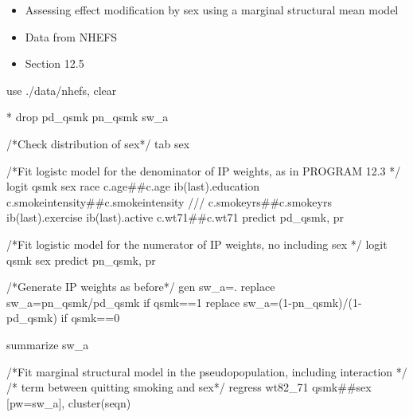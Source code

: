 \documentclass[
  10pt,
  a4paper,
]{book}
\newenvironment{Shaded}{\begin{snugshade}}{\end{snugshade}}
\newcommand{\CommentTok}[1]{\textcolor[rgb]{0.37,0.37,0.37}{#1}}
\newcommand{\FunctionTok}[1]{\textcolor[rgb]{0.28,0.35,0.67}{#1}}
\newcommand{\KeywordTok}[1]{\textcolor[rgb]{0.00,0.46,0.62}{#1}}
\newcommand{\NormalTok}[1]{\textcolor[rgb]{0.00,0.46,0.62}{#1}}
\providecommand{\tightlist}{%
  \setlength{\itemsep}{0pt}\setlength{\parskip}{0pt}}
\begin{document}
\begin{itemize}
\tightlist
\item
  Assessing effect modification by sex using a marginal structural mean model
\item
  Data from NHEFS
\item
  Section 12.5
\end{itemize}

\begin{Shaded}
\begin{Highlighting}[]
\KeywordTok{use}\NormalTok{ ./}\KeywordTok{data}\NormalTok{/nhefs, }\KeywordTok{clear}

\NormalTok{* }\KeywordTok{drop}\NormalTok{ pd\_qsmk pn\_qsmk sw\_a}

\CommentTok{/*Check distribution of sex*/}
\KeywordTok{tab}\NormalTok{ sex}

\CommentTok{/*Fit logistc model for the denominator of IP weights, as in PROGRAM 12.3 */}
\KeywordTok{logit}\NormalTok{ qsmk sex race c.age\#\#c.age ib(}\FunctionTok{last}\NormalTok{).education c.smokeintensity\#\#c.smokeintensity }\CommentTok{///}
\NormalTok{c.smokeyrs\#\#c.smokeyrs ib(}\FunctionTok{last}\NormalTok{).exercise ib(}\FunctionTok{last}\NormalTok{).active c.wt71\#\#c.wt71 }
\KeywordTok{predict}\NormalTok{ pd\_qsmk, pr}

\CommentTok{/*Fit logistic model for the numerator of IP weights, no including sex */}
\KeywordTok{logit}\NormalTok{ qsmk sex}
\KeywordTok{predict}\NormalTok{ pn\_qsmk, pr}

\CommentTok{/*Generate IP weights as before*/}
\KeywordTok{gen}\NormalTok{ sw\_a=.}
\KeywordTok{replace}\NormalTok{ sw\_a=pn\_qsmk/pd\_qsmk }\KeywordTok{if}\NormalTok{ qsmk==1}
\KeywordTok{replace}\NormalTok{ sw\_a=(1{-}pn\_qsmk)/(1{-}pd\_qsmk) }\KeywordTok{if}\NormalTok{ qsmk==0}

\KeywordTok{summarize}\NormalTok{ sw\_a}

\CommentTok{/*Fit marginal structural model in the pseudopopulation, including interaction */}
\CommentTok{/* term between quitting smoking and sex*/}
\KeywordTok{regress}\NormalTok{ wt82\_71 qsmk\#\#sex [pw=sw\_a], }\KeywordTok{cluster}\NormalTok{(seqn)}
\end{Highlighting}
\end{Shaded}
\end{document}
